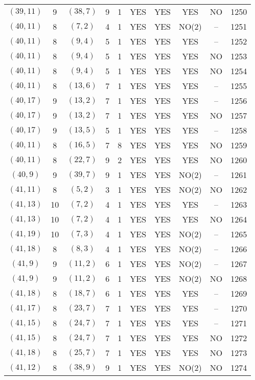 \begin{longtable}{|c|c|c|c|c|c|c|c|c|c|}
$(39, 11)$ & 9 & $(38, 7)$ & 9 & 1 & YES & YES & YES & NO & 1250\\
$(40, 11)$ & 8 & $(7, 2)$ & 4 & 1 & YES & YES & NO(2) & -- & 1251\\
$(40, 11)$ & 8 & $(9, 4)$ & 5 & 1 & YES & YES & YES & -- & 1252\\
$(40, 11)$ & 8 & $(9, 4)$ & 5 & 1 & YES & YES & YES & NO & 1253\\
$(40, 11)$ & 8 & $(9, 4)$ & 5 & 1 & YES & YES & YES & NO & 1254\\
$(40, 11)$ & 8 & $(13, 6)$ & 7 & 1 & YES & YES & YES & -- & 1255\\
$(40, 17)$ & 9 & $(13, 2)$ & 7 & 1 & YES & YES & YES & -- & 1256\\
$(40, 17)$ & 9 & $(13, 2)$ & 7 & 1 & YES & YES & YES & NO & 1257\\
$(40, 17)$ & 9 & $(13, 5)$ & 5 & 1 & YES & YES & YES & -- & 1258\\
$(40, 11)$ & 8 & $(16, 5)$ & 7 & 8 & YES & YES & YES & NO & 1259\\
$(40, 11)$ & 8 & $(22, 7)$ & 9 & 2 & YES & YES & YES & NO & 1260\\
$(40, 9)$ & 9 & $(39, 7)$ & 9 & 1 & YES & YES & NO(2) & -- & 1261\\
$(41, 11)$ & 8 & $(5, 2)$ & 3 & 1 & YES & YES & NO(2) & NO & 1262\\
$(41, 13)$ & 10 & $(7, 2)$ & 4 & 1 & YES & YES & YES & -- & 1263\\
$(41, 13)$ & 10 & $(7, 2)$ & 4 & 1 & YES & YES & YES & NO & 1264\\
$(41, 19)$ & 10 & $(7, 3)$ & 4 & 1 & YES & YES & NO(2) & -- & 1265\\
$(41, 18)$ & 8 & $(8, 3)$ & 4 & 1 & YES & YES & NO(2) & -- & 1266\\
$(41, 9)$ & 9 & $(11, 2)$ & 6 & 1 & YES & YES & NO(2) & -- & 1267\\
$(41, 9)$ & 9 & $(11, 2)$ & 6 & 1 & YES & YES & NO(2) & NO & 1268\\
$(41, 18)$ & 8 & $(18, 7)$ & 6 & 1 & YES & YES & YES & -- & 1269\\
$(41, 17)$ & 8 & $(23, 7)$ & 7 & 1 & YES & YES & YES & -- & 1270\\
$(41, 15)$ & 8 & $(24, 7)$ & 7 & 1 & YES & YES & YES & -- & 1271\\
$(41, 15)$ & 8 & $(24, 7)$ & 7 & 1 & YES & YES & YES & NO & 1272\\
$(41, 18)$ & 8 & $(25, 7)$ & 7 & 1 & YES & YES & YES & NO & 1273\\
$(41, 12)$ & 8 & $(38, 9)$ & 9 & 1 & YES & YES & NO(2) & NO & 1274\\

\end{longtable}
